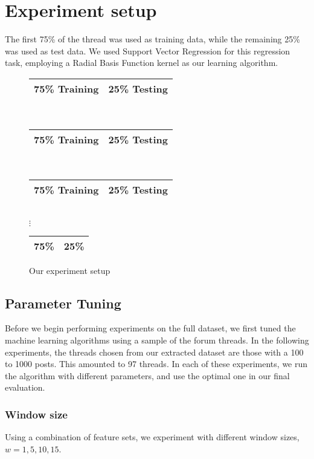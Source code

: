 \section{Experiment setup}
The first 75\% of the thread was used as training data, while the remaining 25\% 
was used as test data. We used Support Vector Regression for this regression 
task, employing a Radial Basis Function kernel as our learning algorithm. 

\begin{figure}
	\footnotesize
	\singlespacing
	\begin{tabular}{| p{} | p{} |}
		\hline
		75\% Training 	&	25\% Testing \\
		\hline
	\end{tabular}\\
	\begin{tabular}{| p{} | p{} |}
		\hline
		75\% Training 	&	25\% Testing \\
		\hline
	\end{tabular}\\
	\begin{tabular}{| p{} | p{} |}
		\hline
		75\% Training 	&	25\% Testing \\
		\hline
	\end{tabular}\\
$\vdots$\\
	\begin{tabular}{| p{} | p{} |}
		\hline
		75\% &	25\% \\
		\hline
	\end{tabular}
	\caption{Our experiment setup}\label{fig:exp_setup}
\end{figure}

\subsection{Parameter Tuning}
Before we begin performing experiments on the full dataset, we first tuned the 
machine learning algorithms using a sample of the forum threads. In the 
following experiments, the threads chosen from our extracted dataset are those 
with a 100 to 1000 posts. This amounted to 97 threads.
In each of these experiments, we run the algorithm with different parameters, 
and use the optimal one in our final evaluation. 

\subsubsection{Window size}
Using a combination of feature sets, we experiment with different window sizes, 
$w = 1, 5, 10, 15$.

